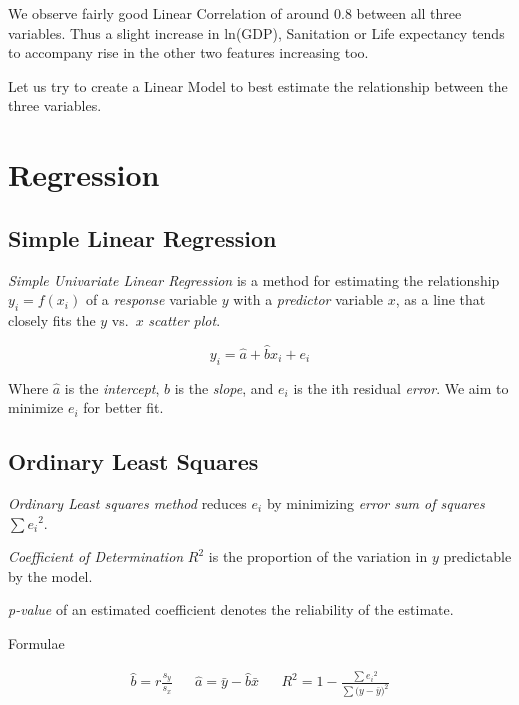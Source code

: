 \documentclass[
]{article}
\begin{document}
We observe fairly good Linear Correlation of around 0.8 between all
three variables. Thus a slight increase in ln(GDP), Sanitation or Life
expectancy tends to accompany rise in the other two features increasing
too.

Let us try to create a Linear Model to best estimate the relationship
between the three variables.

\hypertarget{regression}{%
\section{Regression}\label{regression}}

\hypertarget{simple-linear-regression}{%
\subsection{Simple Linear Regression}\label{simple-linear-regression}}

\emph{Simple Univariate Linear Regression} is a method for estimating
the relationship \(y_i=f(x_i)\) of a \emph{response} variable \(y\) with
a \emph{predictor} variable \(x\), as a line that closely fits the \(y\)
vs.~\(x\) \emph{scatter plot}.

\[
y_i = \hat{a} + \hat{b} x_i + e_i
\]

Where \(\hat{a}\) is the \emph{intercept}, \(\hat{b}\) is the
\emph{slope}, and \(e_i\) is the ith residual \emph{error}. We aim to
minimize \(e_i\) for better fit.

\hypertarget{ordinary-least-squares}{%
\subsection{Ordinary Least Squares}\label{ordinary-least-squares}}

\emph{Ordinary Least squares method} reduces \(e_i\) by minimizing
\emph{error sum of squares} \(\sum{{e_i}^2}\).

\emph{Coefficient of Determination} \(R^2\) is the proportion of the
variation in \(y\) predictable by the model.

\emph{p-value} of an estimated coefficient denotes the reliability of
the estimate.

Formulae

\[
\begin{aligned}
\hat{b} = r\frac{s_y}{s_x} &&
\hat{a} = \bar{y} - \hat{b}\bar{x} &&
R^2 = 1 - \frac{\sum{{e_i}^2}}{\sum{(y-\bar{y}})^2}
\end{aligned}
\]
\end{document}
